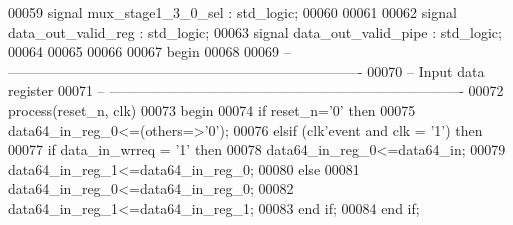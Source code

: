 \begin{DoxyCode}
00059 \textcolor{keywordflow}{signal} \textcolor{vhdlchar}{mux_stage1_3_0_sel}      \textcolor{vhdlchar}{:} \textcolor{comment}{std\_logic};
00060 
00061 
00062 \textcolor{keywordflow}{signal} \textcolor{vhdlchar}{data_out_valid_reg}   \textcolor{vhdlchar}{:} \textcolor{comment}{std\_logic};
00063 \textcolor{keywordflow}{signal} \textcolor{vhdlchar}{data_out_valid_pipe}  \textcolor{vhdlchar}{:} \textcolor{comment}{std\_logic};
00064 
00065 
00066  
00067 \textcolor{vhdlkeyword}{begin}
00068 
00069 \textcolor{keyword}{-- ----------------------------------------------------------------------------}
00070 \textcolor{keyword}{-- Input data register}
00071 \textcolor{keyword}{-- ----------------------------------------------------------------------------}
00072   \textcolor{keywordflow}{process}(reset_n, clk)
00073 \textcolor{vhdlkeyword}{    begin}
00074       \textcolor{keywordflow}{if} \textcolor{vhdlchar}{reset_n}\textcolor{vhdlchar}{=}\textcolor{vhdlchar}{'}\textcolor{vhdllogic}{}\textcolor{vhdllogic}{0}\textcolor{vhdlchar}{'} \textcolor{keywordflow}{then}
00075          \textcolor{vhdlchar}{data64_in_reg_0}\textcolor{vhdlchar}{<=}\textcolor{vhdlchar}{(}\textcolor{keywordflow}{others}\textcolor{vhdlchar}{=}\textcolor{vhdlchar}{>}\textcolor{vhdlchar}{'}\textcolor{vhdllogic}{}\textcolor{vhdllogic}{0}\textcolor{vhdlchar}{'}\textcolor{vhdlchar}{)};
00076       \textcolor{keywordflow}{elsif} \textcolor{vhdlchar}{(}\textcolor{vhdlchar}{clk}\textcolor{vhdlchar}{'}\textcolor{vhdlkeyword}{event} \textcolor{keywordflow}{and} \textcolor{vhdlchar}{clk} \textcolor{vhdlchar}{=} \textcolor{vhdlchar}{'}\textcolor{vhdllogic}{}\textcolor{vhdllogic}{1}\textcolor{vhdlchar}{'}\textcolor{vhdlchar}{)} \textcolor{keywordflow}{then}
00077          \textcolor{keywordflow}{if} \textcolor{vhdlchar}{data_in_wrreq} \textcolor{vhdlchar}{=} \textcolor{vhdlchar}{'}\textcolor{vhdllogic}{}\textcolor{vhdllogic}{1}\textcolor{vhdlchar}{'} \textcolor{keywordflow}{then} 
00078             \textcolor{vhdlchar}{data64_in_reg_0}\textcolor{vhdlchar}{<=}\textcolor{vhdlchar}{data64_in};
00079             \textcolor{vhdlchar}{data64_in_reg_1}\textcolor{vhdlchar}{<=}\textcolor{vhdlchar}{data64_in_reg_0};
00080          \textcolor{keywordflow}{else} 
00081             \textcolor{vhdlchar}{data64_in_reg_0}\textcolor{vhdlchar}{<=}\textcolor{vhdlchar}{data64_in_reg_0};
00082             \textcolor{vhdlchar}{data64_in_reg_1}\textcolor{vhdlchar}{<=}\textcolor{vhdlchar}{data64_in_reg_1};
00083          \textcolor{keywordflow}{end} \textcolor{keywordflow}{if};
00084         \textcolor{keywordflow}{end} \textcolor{keywordflow}{if};

\end{DoxyCode}
